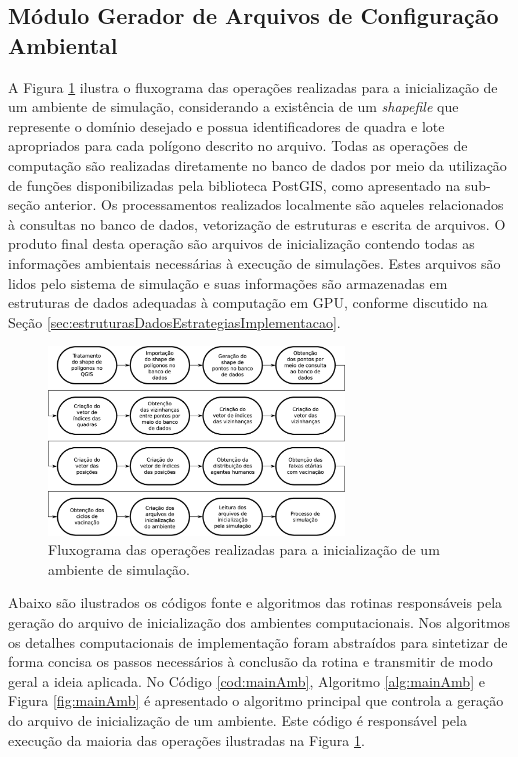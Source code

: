 \newpage

\subsection{Módulo Gerador de Arquivos de Configuração Ambiental}

A Figura \ref{fig:inicializacaoAmbiente} ilustra o fluxograma das operações realizadas para a inicialização de um ambiente de simulação, considerando a existência de um \textit{shapefile} que represente o domínio desejado e possua identificadores de quadra e lote apropriados para cada polígono descrito no arquivo. Todas as operações de computação são realizadas diretamente no banco de dados por meio da utilização de funções disponibilizadas pela biblioteca PostGIS, como apresentado na sub-seção anterior. Os processamentos realizados localmente são aqueles relacionados à consultas no banco de dados, vetorização de estruturas e escrita de arquivos. O produto final desta operação são arquivos de inicialização contendo todas as informações ambientais necessárias à execução de simulações. Estes arquivos são lidos pelo sistema de simulação e suas informações são armazenadas em estruturas de dados adequadas à computação em GPU, conforme discutido na Seção \ref{sec:estruturasDadosEstrategiasImplementacao}.

\begin{figure}[H]
  \centering
  \includegraphics[width=0.7\textwidth]{Figuras/Simula/inicializacaoAmbiente.eps}
  \caption{Fluxograma das operações realizadas para a inicialização de um ambiente de simulação.}
  \label{fig:inicializacaoAmbiente}
\end{figure} 

\newpage

Abaixo são ilustrados os códigos fonte e algoritmos das rotinas responsáveis pela geração do arquivo de inicialização dos ambientes computacionais. Nos algoritmos os detalhes computacionais de implementação foram abstraídos para sintetizar de forma concisa os passos necessários à conclusão da rotina e transmitir de modo geral a ideia aplicada. No Código \ref{cod:mainAmb}, Algoritmo \ref{alg:mainAmb} e Figura \ref{fig:mainAmb} é apresentado o algoritmo principal que controla a geração do arquivo de inicialização de um ambiente. Este código é responsável pela execução da maioria das operações ilustradas na Figura \ref{fig:inicializacaoAmbiente}. 

